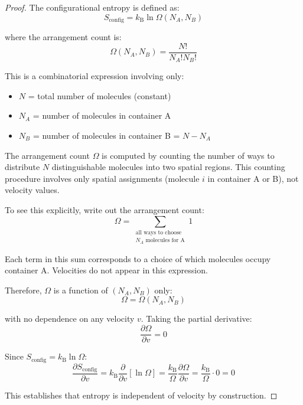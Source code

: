 \documentclass[10pt,twocolumn,letterpaper]{article}
\theoremstyle{definition}
\theoremstyle{remark}
\newcommand{\kb}{k_\text{B}}
\newcommand{\pderiv}[2]{\frac{\partial #1}{\partial #2}}
\newcommand{\Om}{\Omega}
\begin{document}
\begin{proof}
The configurational entropy is defined as:
\begin{equation}
S_{\text{config}} = \kb \ln \Om(N_A, N_B)
\end{equation}

where the arrangement count is:
\begin{equation}
\Om(N_A, N_B) = \frac{N!}{N_A! N_B!}
\end{equation}

This is a combinatorial expression involving only:
\begin{itemize}
\item $N$ = total number of molecules (constant)
\item $N_A$ = number of molecules in container A
\item $N_B$ = number of molecules in container B = $N - N_A$
\end{itemize}

The arrangement count $\Om$ is computed by counting the number of ways to distribute $N$ distinguishable molecules into two spatial regions. This counting procedure involves only spatial assignments (molecule $i$ in container A or B), not velocity values.

To see this explicitly, write out the arrangement count:
\begin{equation}
\Om = \sum_{\substack{\text{all ways to choose} \\ N_A \text{ molecules for A}}} 1
\end{equation}

Each term in this sum corresponds to a choice of which molecules occupy container A. Velocities do not appear in this expression.

Therefore, $\Om$ is a function of $(N_A, N_B)$ only:
\begin{equation}
\Om = \Om(N_A, N_B)
\end{equation}

with no dependence on any velocity $v$. Taking the partial derivative:
\begin{equation}
\pderiv{\Om}{v} = 0
\end{equation}

Since $S_{\text{config}} = \kb \ln \Om$:
\begin{equation}
\pderiv{S_{\text{config}}}{v} = \kb \pderiv{}{v}[\ln \Om] = \frac{\kb}{\Om} \pderiv{\Om}{v} = \frac{\kb}{\Om} \cdot 0 = 0
\end{equation}

This establishes that entropy is independent of velocity by construction.
\end{proof}
\end{document}
